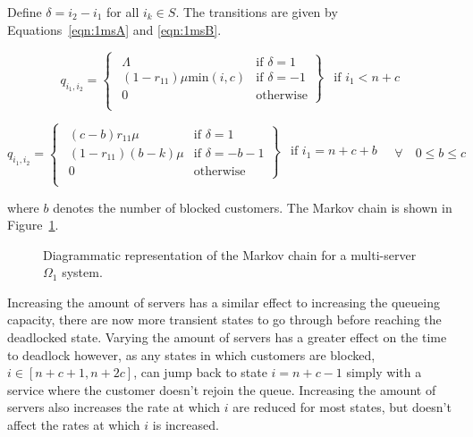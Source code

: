 \documentclass{article}
\numberwithin{equation}{section}
\begin{document}
Define $\delta = i_2 - i_1$ for all $i_k \in S$. The transitions are given by Equations~\ref{eqn:1msA} and \ref{eqn:1msB}.

\begin{equation}\label{eqn:1msA}
  q_{i_1, i_2} = \left\{
  \begin{array}{rr}
    \left. \begin{array}{rr}
      \Lambda & \text{if } \delta = 1 \\
      (1-r_{11})\mu\text{min}(i, c) & \text{if } \delta = -1 \\
      0 & \text{otherwise}
    \end{array} \right\} & \text{if } i_1 < n + c \\
  \end{array} \right.
\end{equation}

\begin{equation}\label{eqn:1msB}
  q_{i_1, i_2} = \left\{
  \begin{array}{rr}
    \left. \begin{array}{rr}
      (c-b)r_{11}\mu & \text{if } \delta = 1 \\
      (1-r_{11})(b-k)\mu & \text{if } \delta = -b-1\\
      0 & \text{otherwise}
    \end{array} \right\} & \text{if } i_1 = n + c + b \\
  \end{array} \right.
  \quad \forall \quad 0 \leq b \leq c
\end{equation}

where $b$ denotes the number of blocked customers.
The Markov chain is shown in Figure~\ref{fig:1nodeMCms}.

\begin{figure}[!htbp]
    \begin{center}
    
    \end{center}
    \caption{Diagrammatic representation of the Markov chain for a multi-server $\Omega_1$ system.}
    \label{fig:1nodeMCms}
\end{figure}

Increasing the amount of servers has a similar effect to increasing the queueing capacity, there are now more transient states to go through before reaching the deadlocked state.
Varying the amount of servers has a greater effect on the time to deadlock however, as any states in which customers are blocked, $i \in [n+c+1, n+2c]$, can jump back to state $i=n+c-1$ simply with a service where the customer doesn't rejoin the queue.
Increasing the amount of servers also increases the rate at which $i$ are reduced for most states, but doesn't affect the rates at which $i$ is increased.
\end{document}
